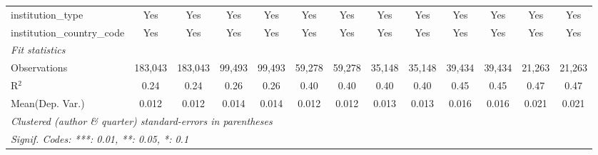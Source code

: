 \begin{tabular}{lcccccccccccc}
   institution\_type                        & Yes            & Yes             & Yes            & Yes             & Yes           & Yes           & Yes          & Yes          & Yes            & Yes            & Yes           & Yes\\  
   institution\_country\_code               & Yes            & Yes             & Yes            & Yes             & Yes           & Yes           & Yes          & Yes          & Yes            & Yes            & Yes           & Yes\\  
   \midrule
   \emph{Fit statistics}\\
   Observations                             & 183,043        & 183,043         & 99,493         & 99,493          & 59,278        & 59,278        & 35,148       & 35,148       & 39,434         & 39,434         & 21,263        & 21,263\\  
   R$^2$                                    & 0.24           & 0.24            & 0.26           & 0.26            & 0.40          & 0.40          & 0.40         & 0.40         & 0.45           & 0.45           & 0.47          & 0.47\\  
Mean(Dep. Var.) & 0.012 & 0.012 & 0.014 & 0.014 & 0.012 & 0.012 & 0.013 & 0.013 & 0.016 & 0.016 & 0.021 & 0.021 \\
   \midrule \midrule
   \multicolumn{13}{l}{\emph{Clustered (author \& quarter) standard-errors in parentheses}}\\
   \multicolumn{13}{l}{\emph{Signif. Codes: ***: 0.01, **: 0.05, *: 0.1}}\\
\end{tabular}
\par\endgroup
